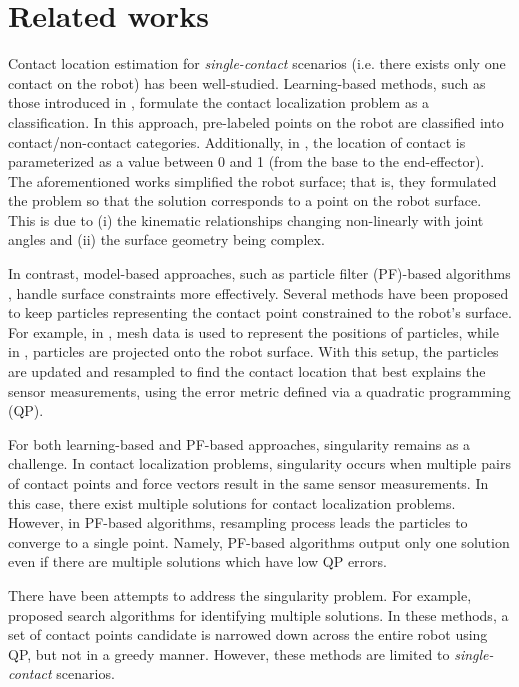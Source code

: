 \section{Related works}
Contact location estimation for \textit{single-contact} scenarios (i.e. there exists only one contact on the robot) has been well-studied.
Learning-based methods, such as those introduced in \cite{zwiener2018contact, popov2020transfer}, formulate the contact localization problem as a classification. 
In this approach, pre-labeled points on the robot are classified into contact/non-contact categories.
Additionally, in \cite{popov2020transfer}, the location of contact is parameterized as a value between 0 and 1 (from the base to the end-effector).
The aforementioned works simplified the robot surface; that is, they formulated the problem so that the solution corresponds to a point on the robot surface. 
This is due to (i) the kinematic relationships changing non-linearly with joint angles and (ii) the surface geometry being complex.

In contrast, model-based approaches, such as particle filter (PF)-based algorithms \cite{10161173, zwiener2019armcl, bimbo2019collision, popov2021multi, manuelli2016localizing}, handle surface constraints more effectively. 
Several methods have been proposed to keep particles representing the contact point constrained to the robot's surface.
For example, in \cite{10161173, zwiener2019armcl, bimbo2019collision, popov2021multi}, mesh data is used to represent the positions of particles, while in \cite{manuelli2016localizing}, particles are projected onto the robot surface.
With this setup, the particles are updated and resampled to find the contact location that best explains the sensor measurements, using the error metric defined via a quadratic programming (QP).

For both learning-based and PF-based approaches, singularity remains as a challenge. 
In contact localization problems, singularity occurs when multiple pairs of contact points and force vectors result in the same sensor measurements.
In this case, there exist multiple solutions for contact localization problems.
However, in PF-based algorithms, resampling process leads the particles to converge to a single point. 
Namely, PF-based algorithms output only one solution even if there are multiple solutions which have low QP errors.

There have been attempts to address the singularity problem. 
For example, \cite{pang2021identifying, popov2021real} proposed search algorithms for identifying multiple solutions.
In these methods, a set of contact points candidate is narrowed down across the entire robot using QP, but not in a greedy manner.
However, these methods are limited to \textit{single-contact} scenarios.


